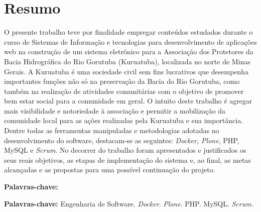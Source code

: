 \chapter*{Resumo}

\vspace{0.4cm}

\noindent O presente trabalho teve por finalidade empregar conteúdos estudados durante o curso de Sistemas de Informação e tecnologias para desenvolvimento de aplicações web na construção de um sistema eletrônico para a Associação dos Protetores da Bacia Hidrográfica do Rio Gorutuba (Kuruatuba), localizada no norte de Minas Gerais. A Kuruatuba é uma sociedade civil sem fins lucrativos que desempenha importantes funções não só na preservação da Bacia do Rio Gorutuba, como também na realização de atividades comunitárias com o objetivo de promover bem estar social para a comunidade em geral. O intuito deste trabalho é agregar mais visibilidade e notoriedade à associação e permitir a mobilização da comunidade local para as ações realizadas pela Kuruatuba e sua importância.   
Dentre todas as ferramentas manipuladas e metodologias adotadas no desenvolvimento do software, destacam-se as seguintes: \textit{Docker, Plone}, PHP, MySQL e \textit{Scrum}.  
No decorrer do trabalho foram apresentados e justificados os seus reais objetivos, as etapas de implementação do sistema e, ao final, as metas alcançadas e as propostas para uma possível continuação do projeto.

\begin{labeling}{\textbf{Palavras-chave:}}
\item[\textbf{Palavras-chave:}] 
Engenharia de Software.
\textit{Docker}.
\textit{Plone}.
PHP.
MySQL.
\textit{Scrum}.
\end{labeling}


